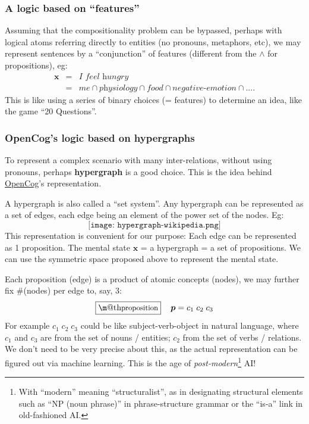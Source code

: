 \documentclass[orivec]{llncs}
\makeatletter
\newcommand{\vect}[1]{\boldsymbol{#1}}
\renewcommand{\boxed}[1]{\fbox{\m@th$\displaystyle\scalebox{0.9}{#1}$} \,}
\makeatother
\begin{document}
\subsubsection{A logic based on ``features''}

Assuming that the compositionality problem can be bypassed, perhaps with logical atoms referring directly to entities (no pronouns, metaphors, etc), we may represent sentences by a ``conjunction'' of features (different from the $\wedge$ for propositions), eg:
\begin{eqnarray}
\vect{x} &=& \textit{I feel hungry} \nonumber \\
 &=& \textit{me} \cap \textit{physiology} \cap \textit{food} \cap \textit{negative-emotion} \cap .... 
\end{eqnarray}
This is like using a series of binary choices (= features) to determine an idea, like the game ``20 Questions''.

\subsubsection{OpenCog's logic based on hypergraphs}

To represent a complex scenario with many inter-relations, without using pronouns, perhaps \textbf{hypergraph} is a good choice.  This is the idea behind \href{http://wiki.opencog.org/w/The_Open_Cognition_Project}{OpenCog}'s representation.

A hypergraph is also called a ``set system''.  Any hypergraph can be represented as a set of edges, each edge being an element of the power set of the nodes.  Eg:
\begin{equation}
\texttt{[image: hypergraph-wikipedia.png]}
\end{equation}
This representation is convenient for our purpose:  Each edge can be represented as 1 proposition.  The mental state $\vect{x}$ = a hypergraph = a set of propositions.  We can use the symmetric space proposed above to represent the mental state.

Each proposition (edge) is a product of atomic concepts (nodes), we may further fix \#(nodes) per edge to, say, 3:
\begin{equation}
\boxed{\mbox{proposition}} \quad \vect{p} = c_1 \; c_2 \; c_3
\end{equation}
For example $c_1 \; c_2 \; c_3$ could be like subject-verb-object in natural language, where $c_1$ and $c_3$ are from the set of nouns / entities;  $c_2$ from the set of verbs / relations.  We don't need to be very precise about this, as the actual representation can be figured out via machine learning.  This is the age of \textit{post-modern}\footnote{With ``modern'' meaning ``structuralist'', as in designating structural elements such as ``NP (noun phrase)'' in phrase-structure grammar or the ``is-a'' link in old-fashioned AI.} AI!
\end{document}
